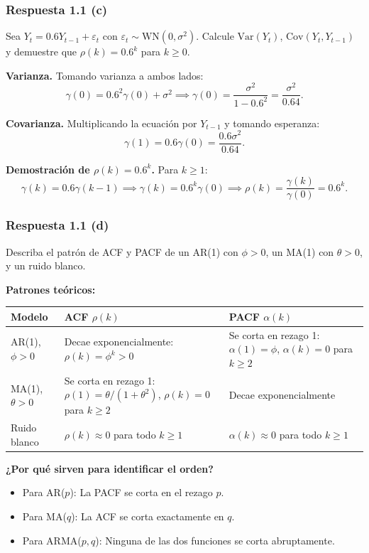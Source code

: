 \documentclass[12pt, letterpaper]{article}
\begin{document}
\subsubsection*{Respuesta 1.1 (c)}

Sea $Y_t = 0.6Y_{t-1} + \varepsilon_t$ con $\varepsilon_t \sim \text{WN}(0, \sigma^2)$. Calcule $\text{Var}(Y_t)$, $\text{Cov}(Y_t, Y_{t-1})$ y demuestre que $\rho(k) = 0.6^k$ para $k \geq 0$.

\textbf{Varianza.} Tomando varianza a ambos lados:
\[
\gamma(0) = 0.6^2\gamma(0) + \sigma^2 \implies \gamma(0) = \frac{\sigma^2}{1 - 0.6^2} = \frac{\sigma^2}{0.64}.
\]

\textbf{Covarianza.} Multiplicando la ecuación por $Y_{t-1}$ y tomando esperanza:
\[
\gamma(1) = 0.6\gamma(0) = \frac{0.6\sigma^2}{0.64}.
\]

\textbf{Demostración de $\rho(k) = 0.6^k$.} Para $k \geq 1$:
\[
\gamma(k) = 0.6\gamma(k-1) \implies \gamma(k) = 0.6^k \gamma(0) \implies \rho(k) = \frac{\gamma(k)}{\gamma(0)} = 0.6^k.
\]

\subsubsection*{Respuesta 1.1 (d)}

Describa el patrón de ACF y PACF de un AR(1) con $\phi > 0$, un MA(1) con $\theta > 0$, y un ruido blanco.

\textbf{Patrones teóricos:}
\begin{center}
\begin{tabular}{|l|l|l|}
\hline
\textbf{Modelo} & \textbf{ACF $\rho(k)$} & \textbf{PACF $\alpha(k)$} \\
\hline
AR(1), $\phi > 0$ & Decae exponencialmente: $\rho(k) = \phi^k > 0$ & Se corta en rezago 1: $\alpha(1)=\phi$, $\alpha(k)=0$ para $k\geq 2$ \\
MA(1), $\theta > 0$ & Se corta en rezago 1: $\rho(1)=\theta/(1+\theta^2)$, $\rho(k)=0$ para $k\geq 2$ & Decae exponencialmente \\
Ruido blanco & $\rho(k) \approx 0$ para todo $k\geq 1$ & $\alpha(k) \approx 0$ para todo $k\geq 1$ \\
\hline
\end{tabular}
\end{center}

\textbf{¿Por qué sirven para identificar el orden?}
\begin{itemize}
    \item Para AR($p$): La PACF se corta en el rezago $p$.
    \item Para MA($q$): La ACF se corta exactamente en $q$.
    \item Para ARMA($p,q$): Ninguna de las dos funciones se corta abruptamente.
\end{itemize}
\end{document}
